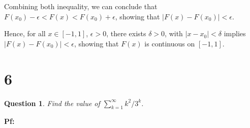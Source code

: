 \documentclass{article}
\newtheorem{question}{Question}
\begin{document}
Combining both inequality, we can conclude that $F(x_0)-\epsilon<F(x)<F(x_0)+\epsilon$, showing that $|F(x)-F(x_0)|<\epsilon$.

Hence, for all $x\in[-1,1]$, $\epsilon>0$, there exists $\delta>0$, with $|x-x_0|<\delta$ implies $|F(x)-F(x_0)|<\epsilon$, showing that $F(x)$ is continuous on $[-1,1]$.


\break

\section*{6}
\begin{myBox}[]{}
    \begin{question}
        Find the value of $\sum_{k=1}^{\infty}k^2/3^k$.
    \end{question}
\end{myBox}

\textbf{Pf:}
\end{document}
